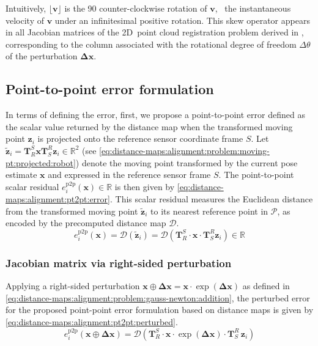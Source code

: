 Intuitively, $\lfloor \mathbf{v} \rfloor$ is the 90\textdegree{}
counter-clockwise rotation of $\mathbf{v}$, \ie\ the instantaneous velocity of
$\mathbf{v}$ under an infinitesimal positive rotation. This skew operator
appears in all Jacobian matrices of the 2D~point cloud registration problem
derived in , corresponding to the column
associated with the rotational degree of freedom $\Delta\theta$ of
the perturbation $\mathbf{\Delta x}$.

\subsection{Point-to-point error formulation}
\label{sec:distance-maps:alignment:pt2pt}

In terms of defining the error, first,
we propose a point-to-point error defined as the scalar value returned by
the distance map when the transformed moving point $\mathbf{z}_i$ is projected
onto the reference sensor coordinate frame $S$. Let
$\tilde{\mathbf{z}}_i = \mathbf{T}_R^S \mathbf{x} \mathbf{T}_S^R \mathbf{z}_i
\in \mathbb{R}^2$ (see
\eqref{eq:distance-maps:alignment:problem:moving-pt:projected:robot})
denote the moving point transformed by the current pose
estimate $\mathbf{x}$ and expressed in the reference sensor frame $S$.
The point-to-point scalar residual $e_i^{\mathrm{p2p}}(\mathbf{x})\in\mathbb{R}$ is
then given by \eqref{eq:distance-maps:alignment:pt2pt:error}.
This scalar residual measures the Euclidean distance from the transformed moving
point $\tilde{\mathbf{z}}_i$ to its nearest reference point in $\mathcal{P}$,
as encoded by the precomputed distance map $\mathcal{D}$.
\begin{equation}
\label{eq:distance-maps:alignment:pt2pt:error}
e_i^{\mathrm{p2p}}(\mathbf{x}) =
\mathcal{D}\!\left(\tilde{\mathbf{z}}_i\right) =
\mathcal{D}\!\left(\mathbf{T}_R^S \cdot \mathbf{x} \cdot \mathbf{T}_S^R \mathbf{z}_i\right) \in \mathbb{R}
\end{equation}

\subsubsection{Jacobian matrix via right-sided perturbation}
\label{sec:distance-maps:alignment:pt2pt:jacobian}

Applying a right-sided perturbation
$\mathbf{x} \oplus \mathbf{\Delta x} = \mathbf{x} \cdot \exp(\mathbf{\Delta x})$
as defined in \eqref{eq:distance-maps:alignment:problem:gauss-newton:addition},
the perturbed error for the proposed point-point error formulation based on
distance maps is given by \eqref{eq:distance-maps:alignment:pt2pt:perturbed}.
\begin{equation}
\label{eq:distance-maps:alignment:pt2pt:perturbed}
e_i^{\mathrm{p2p}}\!\left(\mathbf{x} \oplus \mathbf{\Delta x}\right) =
\mathcal{D}\!\left(
  \mathbf{T}_R^S \cdot \mathbf{x} \cdot \exp\!\left(\mathbf{\Delta x}\right)
  \cdot \mathbf{T}_S^R\,\mathbf{z}_i
\right)
\end{equation}

